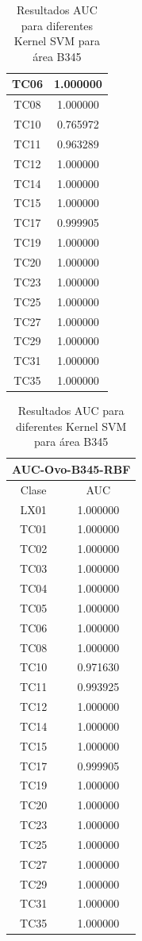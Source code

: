 \begin{table}[H]
{\begin{tabular}{|c|c|}
			TC06 & 1.000000 \\ \hline
			TC08 & 1.000000 \\ \hline
			TC10 & 0.765972 \\ \hline
			TC11 & 0.963289 \\ \hline
			TC12 & 1.000000 \\ \hline
			TC14 & 1.000000 \\ \hline
			TC15 & 1.000000 \\ \hline
			TC17 & 0.999905 \\ \hline
			TC19 & 1.000000 \\ \hline
			TC20 & 1.000000 \\ \hline
			TC23 & 1.000000 \\ \hline
			TC25 & 1.000000 \\ \hline
			TC27 & 1.000000 \\ \hline
			TC29 & 1.000000 \\ \hline
			TC31 & 1.000000 \\ \hline
			TC35 & 1.000000 \\ \hline
		\end{tabular}
		\begin{tabular}{|c|c|}
			\hline
			\multicolumn{2}{|c|}{AUC-Ovo-B345-RBF} \\ \hline \hline
			Clase & AUC \\ \hline
			LX01 & 1.000000 \\ \hline
			TC01 & 1.000000 \\ \hline
			TC02 & 1.000000 \\ \hline
			TC03 & 1.000000 \\ \hline
			TC04 & 1.000000 \\ \hline
			TC05 & 1.000000 \\ \hline
			TC06 & 1.000000 \\ \hline
			TC08 & 1.000000 \\ \hline
			TC10 & 0.971630 \\ \hline
			TC11 & 0.993925 \\ \hline
			TC12 & 1.000000 \\ \hline
			TC14 & 1.000000 \\ \hline
			TC15 & 1.000000 \\ \hline
			TC17 & 0.999905 \\ \hline
			TC19 & 1.000000 \\ \hline
			TC20 & 1.000000 \\ \hline
			TC23 & 1.000000 \\ \hline
			TC25 & 1.000000 \\ \hline
			TC27 & 1.000000 \\ \hline
			TC29 & 1.000000 \\ \hline
			TC31 & 1.000000 \\ \hline
			TC35 & 1.000000 \\ \hline
	\end{tabular}}
	\caption{Resultados AUC para diferentes Kernel SVM para área B345}
	\label{res:svc_b345}
\end{table}

